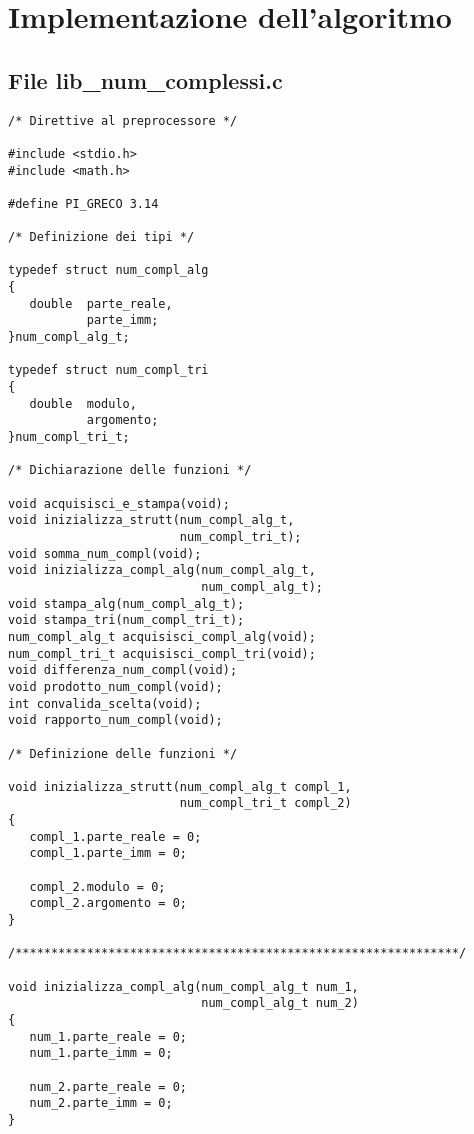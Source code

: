 \documentclass[a4paper,10pt]{article}
\begin{document}
\newpage

\section*{ \textbf{Implementazione dell'algoritmo} }

\subsection*{File lib\_num\_complessi.c}		%
\begin{verbatim}
/* Direttive al preprocessore */

#include <stdio.h>
#include <math.h>

#define PI_GRECO 3.14

/* Definizione dei tipi */

typedef struct num_compl_alg
{
   double  parte_reale,		
           parte_imm;		
}num_compl_alg_t;

typedef struct num_compl_tri		
{
   double  modulo,
           argomento;
}num_compl_tri_t;

/* Dichiarazione delle funzioni */

void acquisisci_e_stampa(void);
void inizializza_strutt(num_compl_alg_t,
                        num_compl_tri_t);
void somma_num_compl(void);			
void inizializza_compl_alg(num_compl_alg_t,
                           num_compl_alg_t);			   			
void stampa_alg(num_compl_alg_t);		
void stampa_tri(num_compl_tri_t);		
num_compl_alg_t acquisisci_compl_alg(void);	
num_compl_tri_t acquisisci_compl_tri(void);	
void differenza_num_compl(void);		
void prodotto_num_compl(void);			
int convalida_scelta(void);			
void rapporto_num_compl(void);

/* Definizione delle funzioni */

void inizializza_strutt(num_compl_alg_t compl_1,
                        num_compl_tri_t compl_2)
{
   compl_1.parte_reale = 0;
   compl_1.parte_imm = 0;

   compl_2.modulo = 0;
   compl_2.argomento = 0;
}

/**************************************************************/

void inizializza_compl_alg(num_compl_alg_t num_1,
                           num_compl_alg_t num_2)
{
   num_1.parte_reale = 0;
   num_1.parte_imm = 0;

   num_2.parte_reale = 0;
   num_2.parte_imm = 0;
}


\end{verbatim}
\end{document}
